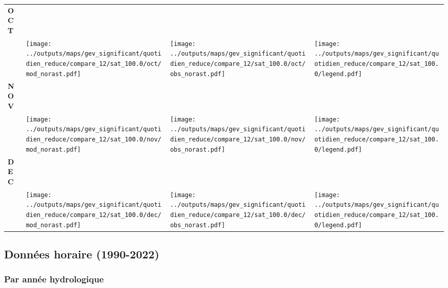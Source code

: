 \documentclass[
  letterpaper,
  DIV=11,
  numbers=noendperiod]{scrartcl}
\begin{document}
\begin{longtable*}{m{2.0cm}m{7.9cm}m{7.9cm}m{1cm}}
\centering \textbf{OCT} \\[0.2em] \begin{tabular}{r@{\hspace{0.2em}}l}\end{tabular} & \centering \texttt{[image: ../outputs/maps/gev\_significant/quotidien\_reduce/compare\_12/sat\_100.0/oct/mod\_norast.pdf]} & \centering \texttt{[image: ../outputs/maps/gev\_significant/quotidien\_reduce/compare\_12/sat\_100.0/oct/obs\_norast.pdf]} & \centering \texttt{[image: ../outputs/maps/gev\_significant/quotidien\_reduce/compare\_12/sat\_100.0/legend.pdf]} \tabularnewline
\centering \textbf{NOV} \\[0.2em] \begin{tabular}{r@{\hspace{0.2em}}l}\end{tabular} & \centering \texttt{[image: ../outputs/maps/gev\_significant/quotidien\_reduce/compare\_12/sat\_100.0/nov/mod\_norast.pdf]} & \centering \texttt{[image: ../outputs/maps/gev\_significant/quotidien\_reduce/compare\_12/sat\_100.0/nov/obs\_norast.pdf]} & \centering \texttt{[image: ../outputs/maps/gev\_significant/quotidien\_reduce/compare\_12/sat\_100.0/legend.pdf]} \tabularnewline
\centering \textbf{DEC} \\[0.2em] \begin{tabular}{r@{\hspace{0.2em}}l}\end{tabular} & \centering \texttt{[image: ../outputs/maps/gev\_significant/quotidien\_reduce/compare\_12/sat\_100.0/dec/mod\_norast.pdf]} & \centering \texttt{[image: ../outputs/maps/gev\_significant/quotidien\_reduce/compare\_12/sat\_100.0/dec/obs\_norast.pdf]} & \centering \texttt{[image: ../outputs/maps/gev\_significant/quotidien\_reduce/compare\_12/sat\_100.0/legend.pdf]} \tabularnewline
\end{longtable*}

\subsection{Données horaire
(1990-2022)}\label{donnuxe9es-horaire-1990-2022-1}

\subsubsection{Par année
hydrologique}\label{par-annuxe9e-hydrologique-7}
\end{document}
